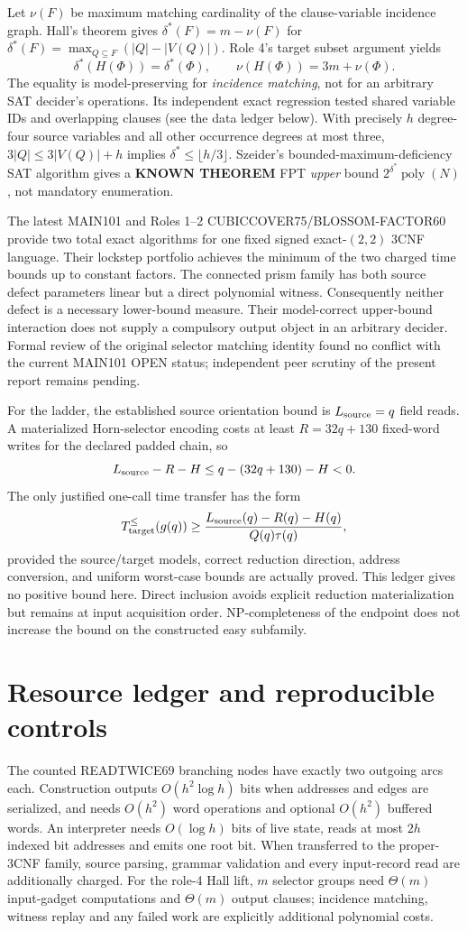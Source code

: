 \documentclass[11pt]{article}
\begin{document}
Let $\nu(F)$ be maximum matching cardinality of the clause-variable incidence graph. Hall's theorem gives $\delta^*(F)=m-\nu(F)$ for $\delta^*(F)=\max_{Q\subseteq F}(|Q|-|V(Q)|)$. Role 4's target subset argument yields
\[
\delta^*(H(\Phi))=\delta^*(\Phi),\qquad
\nu(H(\Phi))=3m+\nu(\Phi).
\]
The equality is model-preserving for \emph{incidence matching}, not for an arbitrary SAT decider's operations. Its independent exact regression tested shared variable IDs and overlapping clauses (see the data ledger below). With precisely $h$ degree-four source variables and all other occurrence degrees at most three, $3|Q|\le3|V(Q)|+h$ implies $\delta^*\le\lfloor h/3\rfloor$. Szeider's bounded-maximum-deficiency SAT algorithm gives a \textbf{KNOWN THEOREM} FPT \emph{upper} bound $2^{\delta^*}\operatorname{poly}(N)$, not mandatory enumeration.

The latest MAIN101 and Roles 1--2 CUBICCOVER75/BLOSSOM-FACTOR60 provide two total exact algorithms for one fixed signed exact-$(2,2)$ 3CNF language. Their lockstep portfolio achieves the minimum of the two charged time bounds up to constant factors. The connected prism family has both source defect parameters linear but a direct polynomial witness. Consequently neither defect is a necessary lower-bound measure. Their model-correct upper-bound interaction does not supply a compulsory output object in an arbitrary decider. Formal review of the original selector matching identity found no conflict with the current MAIN101 OPEN status; independent peer scrutiny of the present report remains pending.

For the ladder, the established source orientation bound is $L_{\rm source}=q$ field reads. A materialized Horn-selector encoding costs at least $R=32q+130$ fixed-word writes for the declared padded chain, so
\[
L_{\rm source}-R-H\le q-(32q+130)-H<0.
\]
The only justified one-call time transfer has the form
\[
T_{\rm target}^{\le}(g(q))\ge
\frac{L_{\rm source}(q)-R(q)-H(q)}{Q(q)\tau(q)},
\]
provided the source/target models, correct reduction direction, address conversion, and uniform worst-case bounds are actually proved. This ledger gives no positive bound here. Direct inclusion avoids explicit reduction materialization but remains at input acquisition order. NP-completeness of the endpoint does not increase the bound on the constructed easy subfamily.

\section{Resource ledger and reproducible controls}
The counted READTWICE69 branching nodes have exactly two outgoing arcs each. Construction outputs $O(h^2\log h)$ bits when addresses and edges are serialized, and needs $O(h^2)$ word operations and optional $O(h^2)$ buffered words. An interpreter needs $O(\log h)$ bits of live state, reads at most $2h$ indexed bit addresses and emits one root bit. When transferred to the proper-3CNF family, source parsing, grammar validation and every input-record read are additionally charged. For the role-4 Hall lift, $m$ selector groups need $\Theta(m)$ input-gadget computations and $\Theta(m)$ output clauses; incidence matching, witness replay and any failed work are explicitly additional polynomial costs.
\end{document}
